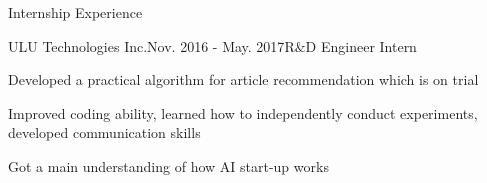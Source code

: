\documentclass{resume} %
\begin{document}
\begin{comment}
\begin{rSubsection}{Large-Scale WEB Vulnerability Detection by Supervised Learning}{Oct. 2014 - June. 2015}{}{}
\item Developed an algorithm to detect malicious URLs from Shanghai Telecomm 120 gigabytes web log.
\item Extracted information including Whois, IP connection and URLs to form feature vectors.
\item Trained multiclass-SVM to classify benign or malicious URLs based on labels obtained from Google Safe Browsing API and achieved 86\% accuracy.
\end{rSubsection}

\begin{rSubsection}{Vehicle WLAN Based Car Sharing Platform}{Mar. 2014 - Dec. 2014}{}{}
\item Designed a car sharing system in 3-person team with vehicle based hardware, Android APP and web platform to improve efficiency of car rental service. 
\item Enrolled in Fourth Shanghai College Innovation \& Entrepreneurship Forum (3/300 selected from SJTU).
\item Patented in China : CN104836860 A
\end{rSubsection}

\end{rSection}
\vspace{0.5em}
\end{comment}
\begin{rSection}{Internship Experience}
\begin{rSubsection}{ULU Technologies Inc.}{Nov. 2016 - May. 2017}{R$\&$D  Engineer Intern}{}
\item Developed a practical algorithm for article recommendation which is on trial
\item Improved coding ability, learned how to independently conduct experiments, developed communication skills
\item Got a main understanding of how AI start-up works
\end{rSubsection}
\end{rSection}
\end{document}
